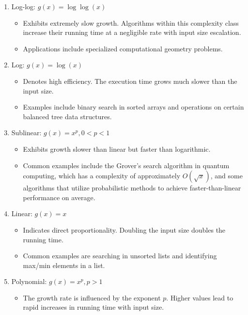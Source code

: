 \documentclass[12pt]{article}
\theoremstyle{definition}
\begin{document}
\begin{enumerate}
    \item Log-log: $g(x) = \log \log(x)$
    \begin{itemize}
        \item Exhibits extremely slow growth. Algorithms within this complexity class increase their running time at a negligible rate with input size escalation.
        
        \item Applications include specialized computational geometry problems.
    \end{itemize}
    
    \item Log: $g(x) = \log(x)$
    \begin{itemize}
        \item Denotes high efficiency. The execution time grows much slower than the input size.
        
        \item Examples include binary search in sorted arrays and operations on certain balanced tree data structures.
    \end{itemize}
    
    \item Sublinear: $g(x) = x^p, 0 < p < 1$
    \begin{itemize}
        \item Exhibits growth slower than linear but faster than logarithmic.
        
        \item Common examples include the Grover's search algorithm in quantum computing, which has a complexity of approximately $O(\sqrt{x})$, and some algorithms that utilize probabilistic methods to achieve faster-than-linear performance on average.
    \end{itemize}
    
    \item Linear: $g(x) = x$
    \begin{itemize}
        \item Indicates direct proportionality. Doubling the input size doubles the running time.
        
        \item Common examples are searching in unsorted lists and identifying max/min elements in a list.
    \end{itemize}
    
    \item Polynomial: $g(x) = x^p, p > 1$
    \begin{itemize}
        \item The growth rate is influenced by the exponent $p$. Higher values lead to rapid increases in running time with input size.
        

\end{itemize}
\end{enumerate}
\end{document}
